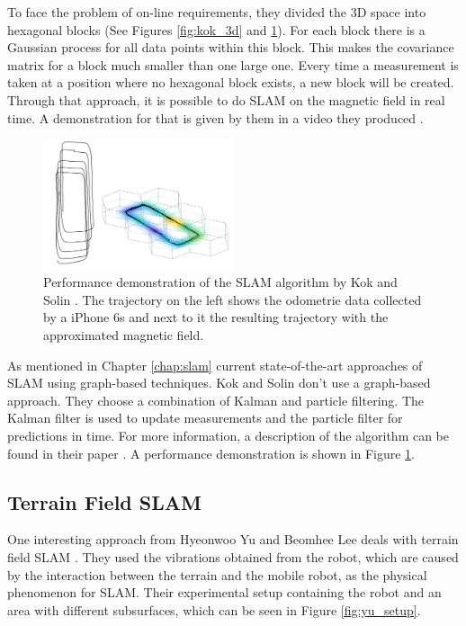 To face the problem of on-line requirements, they divided the 3D space into hexagonal blocks
(See Figures \ref{fig:kok_3d} and \ref{fig:kok_example}). For each block there is a Gaussian 
process for all data points within this block. This makes the covariance matrix for a block
much smaller than one large one. Every time a measurement is taken at a position where no hexagonal 
block exists, a new block will be created. Through that approach, it is possible to do SLAM on the 
magnetic field in real time. A demonstration for that is given by them in a video they produced 
\cite{kok_scalable_2018}.

\begin{figure}[h!]
	\centering
	\includegraphics[width=0.5\textwidth]{images/kok_example.png}
	\caption{
        Performance demonstration of the SLAM algorithm by Kok and Solin \cite{kok_scalable_2018}.
        The trajectory on the left shows the odometrie data collected by a iPhone 6s and next to it
        the resulting trajectory with the approximated magnetic field.
        }
	\label{fig:kok_example}
\end{figure}

As mentioned in Chapter \ref{chap:slam} current state-of-the-art approaches of SLAM using graph-based
techniques. Kok and Solin don't use a graph-based approach. They choose a combination of Kalman
and particle filtering. The Kalman filter is used to update measurements and the particle filter
for predictions in time. For more information, a description of the algorithm can be found in their
paper \cite{kok_scalable_2018}. A performance demonstration is shown in Figure \ref{fig:kok_example}.

\subsection{Terrain Field SLAM}
\label{chap:terrain_field}
One interesting approach from Hyeonwoo Yu and Beomhee Lee deals with terrain field SLAM \cite{yu_terrain_2018}. 
They used the vibrations obtained from the robot, which are caused by the interaction between the terrain and 
the mobile robot, as the physical phenomenon for SLAM. Their experimental setup containing the robot and an
area with different subsurfaces, which can be seen in Figure \ref{fig:yu_setup}.

